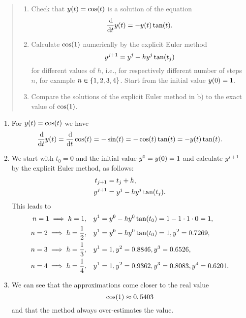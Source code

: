 \documentclass{exercise}
\begin{document}
	\section{}

	\begin{quote}
		\begin{enumerate}
			\item Check that \(y\parentheses*{t} = \cos\parentheses*{t}\) is a solution of the equation
			\[
				\frac{\d}{\d t}y\parentheses*{t} = -y\parentheses*{t}\tan\parentheses*{t}.
			\]
			\item Calculate \(\cos\parentheses*{1}\) numerically by the explicit Euler method
			\[
				y^{j + 1} = y^j + hy^j \tan\parentheses*{t_j}
			\]
			for different values of \(h\), i.e., for respectively different number of steps \(n\), for example \(n \in \braces*{1, 2, 3, 4}\).
			Start from the initial value \(y\parentheses*{0} = 1\).
			\item Compare the solutions of the explicit Euler method in b) to the exact value of \(\cos\parentheses*{1}\).
		\end{enumerate}
	\end{quote}

	\begin{enumerate}
		\item For \(y\parentheses*{t} = \cos\parentheses*{t}\) we have
		\[
			\frac{\d}{\d t}y\parentheses*{t} = \frac{\d}{\d t}\cos\parentheses*{t} = -\sin\parentheses*{t} = -\cos\parentheses*{t}\tan\parentheses*{t} = -y\parentheses*{t}\tan\parentheses*{t}.
		\]
		\item We start with \(t_0 = 0\) and the initial value \(y^0 = y\parentheses*{0} = 1\) and calculate \(y^{j + 1}\) by the explicit Euler method, as follows:
		\begin{align*}
			t_{j + 1} &= t_j + h,\\
			y^{j + 1} &= y^j - hy^j \tan\parentheses*{t_j}.
		\end{align*}
		This leads to
		\begin{align*}
			n = 1 \implies h = 1, \quad &y^1 = y^0 - hy^0 \tan\parentheses*{t_0} = 1 - 1 \cdot 1 \cdot 0 = 1,\\
			n = 2 \implies h = \frac{1}{2}, \quad &y^1 = y^0 - hy^0 \tan\parentheses*{t_0} = 1, y^2 = 0.7269,\\
			n = 3 \implies h = \frac{1}{3}, \quad &y^1 = 1, y^2 = 0.8846, y^3 = 0.6526,\\
			n = 4 \implies h = \frac{1}{4}, \quad &y^1 = 1, y^2 = 0.9362, y^3 = 0.8083, y^4 = 0.6201.
		\end{align*}
		\item We can see that the approximations come closer to the real value
		\[
			\cos\parentheses*{1} \approx 0,5403
		\]
		and that the method always over-estimates the value.
	\end{enumerate}
\end{document}
